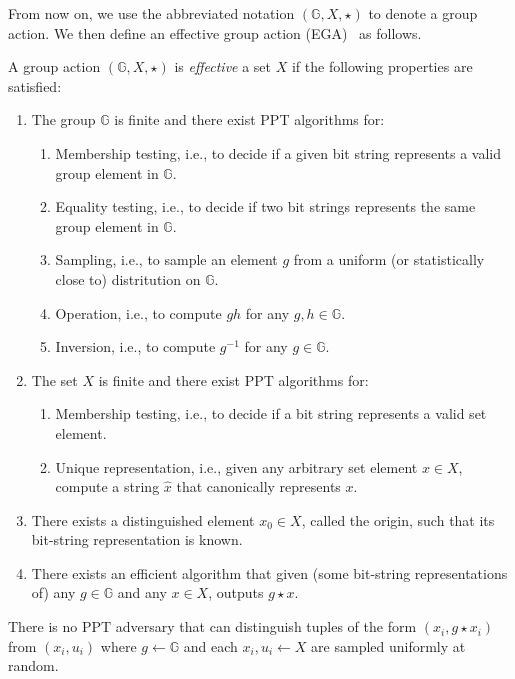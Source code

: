 \documentclass[a4paper,10pt]{article}
\begin{document}
From now on, we use the abbreviated notation $(\mathbb{G}, X, \star)$ to denote a group action. 
We then define an effective group action (EGA)~\cite{AFMP-ASIACRYPT-2020} as follows. 
\begin{definition}
A group action $(\mathbb{G}, X, \star)$ is \emph{effective} a set $X$ if the following properties are satisfied:  
\begin{enumerate}
\item The group $\mathbb{G}$ is finite and there exist PPT algorithms for: 
\begin{enumerate}
    \item Membership testing, i.e., to decide if a given bit string represents a valid group element in $\mathbb{G}$. 
    \item Equality testing, i.e., to decide if two bit strings represents the same group element in $\mathbb{G}$.
    \item Sampling, i.e., to sample an element $g$ from a uniform (or statistically close to) distritution on $\mathbb{G}$.  
    \item Operation, i.e., to compute $gh$ for any $g, h \in \mathbb{G}$. 
    \item Inversion, i.e., to compute $g^{-1}$ for any $g \in \mathbb{G}$.
\end{enumerate}

\item The set $X$ is finite and there exist PPT algorithms for: 
\begin{enumerate}
    \item Membership testing, i.e., to decide if a bit string represents a valid set element. 

    \item Unique representation, i.e., given any arbitrary set element $x \in X$, 
        compute a string $\hat{x}$ that canonically represents $x$.
\end{enumerate}

\item There exists a distinguished element $x_0 \in X$, 
    called the origin, such that its bit-string representation is known.

\item There exists an efficient algorithm that given (some bit-string representations of) any $g \in \mathbb{G}$ 
    and any $x \in X$, outputs $g \star x$.
\end{enumerate} 
\end{definition}

\begin{definition}
There is no PPT adversary that can distinguish tuples of the form $(x_i, g \star x_i)$ 
from $(x_i, u_i)$ where $g \leftarrow \mathbb{G}$ and each $x_i, u_i \leftarrow X$ are sampled uniformly at random.
\end{definition}

	
\end{document}

